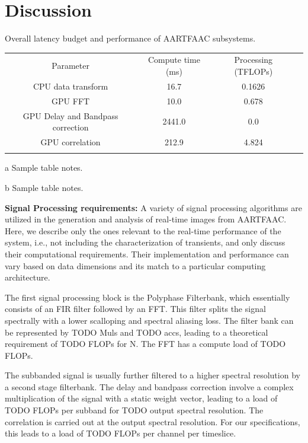 \documentclass{ws-jai}
\begin{document}
\section {\label{sec:discussion} Discussion}
\begin{wstable}[h]
\caption{Overall latency budget and performance of AARTFAAC subsystems.}
\begin{tabular}{@{}cccc@{}} \toprule
Parameter & Compute time (ms) & Processing (TFLOPs)\\ \colrule
CPU data transform & 16.7 &0.1626  \\
GPU FFT & \hphantom{0}10.0&0.678  \\
GPU Delay and Bandpass correction & 2441.0 & 0.0\tnote{a}  \\
GPU correlation & 212.9 & 4.824\tnote{a}  \\ \colrule
\end{tabular}
\begin{tablenotes}
\item[a] Sample table notes.
\item[b] Sample table notes.
\end{tablenotes}
\label{tab:afaac_specs}
\end{wstable}

\noindent \textbf {Signal Processing requirements:}
A variety  of signal processing  algorithms are  utilized in the  generation and
analysis of  real-time images from  AARTFAAC.  Here,  we describe only  the ones
relevant to  the real-time performance  of the  system, i.e., not  including the
characterization   of  transients,   and   only   discuss  their   computational
requirements.  Their  implementation and  performance  can  vary based  on  data
dimensions and its match to a particular computing architecture.

The first signal processing block is the Polyphase Filterbank, which essentially
consists of  an FIR  filter followed by  an FFT. This  filter splits  the signal
spectrally with a  lower scalloping and spectral aliasing loss.  The filter bank
can  be  represented by  TODO  Muls  and TODO  accs,  leading  to a  theoretical
requirement of TODO FLOPs for N. The FFT has a compute load of TODO FLOPs.

The subbanded signal is usually further filtered to a higher spectral resolution
by  a second  stage  filterbank. The  delay and  bandpass  correction involve  a
complex multiplication of  the signal with a static weight  vector, leading to a
load  of  TODO FLOPs  per  subband  for  TODO  output spectral  resolution.  The
correlation  is  carried  out  at   the  output  spectral  resolution.  For  our
specifications, this leads to a load of TODO FLOPs per channel per timeslice.
\end{document}
